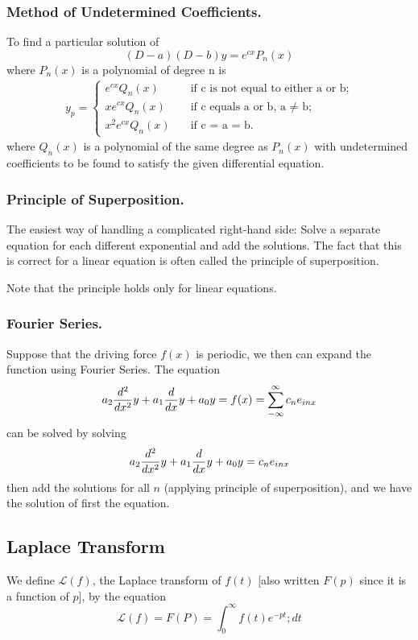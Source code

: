 \documentclass[../main.tex]{subfiles}
\begin{document}
\subsubsection*{Method of Undetermined Coefficients.} To find a particular solution of
\begin{equation*}
    (D - a)(D - b)y=e^{cx}P_n(x)
\end{equation*}
where $P_n(x)$ is a polynomial of degree n is
\begin{align*}
    y_p=
    \begin{cases}
        e^{cx}Q_n(x) \quad&\text{if c is not equal to either a or b;}\\
        xe^{cx}Q_n(x) \quad&\text{if c equals a or b, a  $\neq$ b;}\\
        x^2e^{cx}Q_n(x) \quad&\text{if c = a = b.}
    \end{cases}
\end{align*}
where $Q_n(x)$ is a polynomial of the same degree as $P_n(x)$ with undetermined
coefficients to be found to satisfy the given differential equation.

\subsubsection*{Principle of Superposition.} The easiest way of handling a complicated right-hand side: Solve a separate equation for each different exponential and add the solutions. The fact that this is correct for a linear equation is often called the principle of superposition. 

Note that the principle holds only for linear equations.

\subsubsection*{Fourier Series.}
Suppose that the driving force $f(x)$ is periodic, we then can expand the function using Fourier Series. The equation
\begin{equation*}
    a_2\frac{d^2}{dx^2} y+a_1\frac{d}{dx} y+a_0y=f(x)=\sum_{-\infty}^{\infty}c_ne_{inx}
\end{equation*}
can be solved by solving
\begin{equation*}
    a_2\frac{d^2}{dx^2} y+a_1\frac{d}{dx} y+a_0y=c_ne_{inx}
\end{equation*}
then add the solutions for all $n$ (applying principle of superposition), and we have the solution of first the equation.

\subsection*{Laplace Transform}
We define $\mathcal{L}(f )$, the Laplace transform of $f (t)$ [also written $F (p)$ since it is a function of $p$], by the equation
\begin{equation*}
    \mathcal{L}(f)=F(P)=\int_{0}^{\infty}f(t)e^{-pt};dt
\end{equation*}
\end{document}

